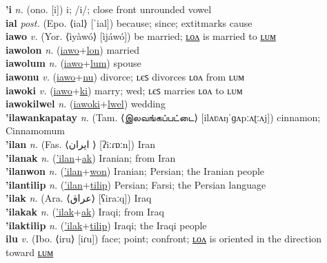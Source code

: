 \textbf{'i} \textit{n.} (ono. [i])
i; /i/; close front unrounded vowel \label{'i} \\
\textbf{ial} \textit{post.} (Epo. ⟨ial⟩ [ˈial])
because; since; 	extit{marks cause} \label{ial} \\
\textbf{iawo} \textit{v.} (Yor. ⟨ìyàwó⟩ [ìjáwó])
be married; \hyperref[iawolon]{ʟᴏᴧ} is married to \hyperref[iawolum]{ʟᴜᴍ} \label{iawo} \\
\textbf{iawolon} \textit{n.} (\hyperref[iawo]{iawo}+\hyperref[lon]{lon})
married \label{iawolon} \\
\textbf{iawolum} \textit{n.} (\hyperref[iawo]{iawo}+\hyperref[lum]{lum})
spouse \label{iawolum} \\
\textbf{iawonu} \textit{v.} (\hyperref[iawo]{iawo}+\hyperref[nu]{nu})
divorce; ʟєꜱ divorces ʟᴏᴧ from ʟᴜᴍ \label{iawonu} \\
\textbf{iawoki} \textit{v.} (\hyperref[iawo]{iawo}+\hyperref[ki]{ki})
marry; wed; ʟєꜱ marries ʟᴏᴧ to ʟᴜᴍ \label{iawoki} \\
\textbf{iawokilwel} \textit{n.} (\hyperref[iawoki]{iawoki}+\hyperref[lwel]{lwel})
wedding \label{iawokilwel} \\
\textbf{'ilawankapatay} \textit{n.} (Tam. ⟨இலவங்கப்பட்டை⟩ [ilʌʋʌŋˈɡʌpːʌʈːʌj])
cinnamon; Cinnamomum \label{'ilawankapatay} \\
\textbf{'ilan} \textit{n.} (Fas. ⟨ایران‎ ⟩ [ʔiːɾɒːn])
Iran \label{'ilan} \\
\textbf{'ilanak} \textit{n.} (\hyperref['ilan]{'ilan}+\hyperref[ak]{ak})
Iranian; from Iran \label{'ilanak} \\
\textbf{'ilanwon} \textit{n.} (\hyperref['ilan]{'ilan}+\hyperref[won]{won})
Iranian; Persian; the Iranian people \label{'ilanwon} \\
\textbf{'ilantilip} \textit{n.} (\hyperref['ilan]{'ilan}+\hyperref[tilip]{tilip})
Persian; Farsi; the Persian language \label{'ilantilip} \\
\textbf{'ilak} \textit{n.} (Ara. ⟨عراق⟩ [ʕiraːq])
Iraq \label{'ilak} \\
\textbf{'ilakak} \textit{n.} (\hyperref['ilak]{'ilak}+\hyperref[ak]{ak})
Iraqi; from Iraq \label{'ilakak} \\
\textbf{'ilaktilip} \textit{n.} (\hyperref['ilak]{'ilak}+\hyperref[tilip]{tilip})
Iraqi; the Iraqi people \label{'ilaktilip} \\
\textbf{ilu} \textit{v.} (Ibo. ⟨iru⟩ [iɾu])
face; point; confront; \hyperref[ilulon]{ʟᴏᴧ} is oriented in the direction toward \hyperref[ilulum]{ʟᴜᴍ} \label{ilu} \\
